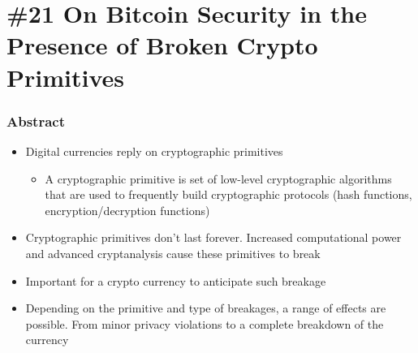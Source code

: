\section{\#21 On Bitcoin Security in the Presence of Broken Crypto Primitives}
\subsubsection{Abstract}
\begin{itemize}
	\item Digital currencies reply on cryptographic primitives
	\begin{itemize}
		\item A cryptographic primitive is set of low-level cryptographic algorithms that are used to frequently build cryptographic protocols (hash functions, encryption/decryption functions)
	\end{itemize}
	\item Cryptographic primitives don't last forever. Increased computational power and advanced cryptanalysis cause these primitives to break
	\item Important for a crypto currency to anticipate such breakage
	\item Depending on the primitive and type of breakages, a range of effects are possible. From minor privacy violations to a complete breakdown of the currency
\end{itemize}